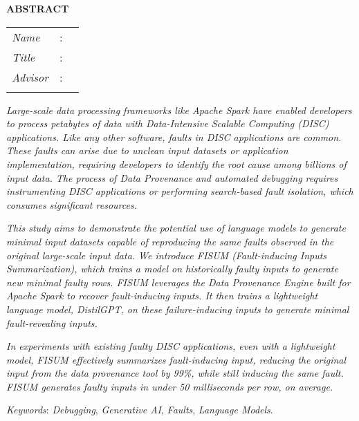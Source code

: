 \begin{center}
  \large\textbf{ABSTRACT}
\end{center}

\vspace{2ex}

\begingroup
\setlength{\tabcolsep}{0pt}

\noindent
\begin{tabularx}{\textwidth}{l >{\centering}m{3em} X}
  \emph{Name}     & : & \name{}         \\

  \emph{Title}    & : & \engtatitle{}   \\

  \emph{Advisor}    & : & \advisor{}   \\

  \\
\end{tabularx}
\endgroup

\emph{Large-scale data processing frameworks like Apache Spark have enabled developers to process petabytes of data with Data-Intensive Scalable Computing (DISC) applications. Like any other software, faults in DISC applications are common. These faults can arise due to unclean input datasets or application implementation, requiring developers to identify the root cause among billions of input data. The process of Data Provenance and automated debugging requires instrumenting DISC applications or performing search-based fault isolation, which consumes significant resources.}

\emph{This study aims to demonstrate the potential use of language models to generate minimal input datasets capable of reproducing the same faults observed in the original large-scale input data. We introduce FISUM (Fault-inducing Inputs Summarization), which trains a model on historically faulty inputs to generate new minimal faulty rows. FISUM leverages the Data Provenance Engine built for Apache Spark to recover fault-inducing inputs. It then trains a lightweight language model, DistilGPT, on these failure-inducing inputs to generate minimal fault-revealing inputs.}

\emph{In experiments with existing faulty DISC applications, even with a lightweight model, FISUM effectively summarizes fault-inducing input, reducing the original input from the data provenance tool by 99\%, while still inducing the same fault. FISUM generates faulty inputs in under 50 milliseconds per row, on average.}

\emph{Keywords}: \emph{Debugging}, \emph{Generative AI}, \emph{Faults}, \emph{Language Models}.
